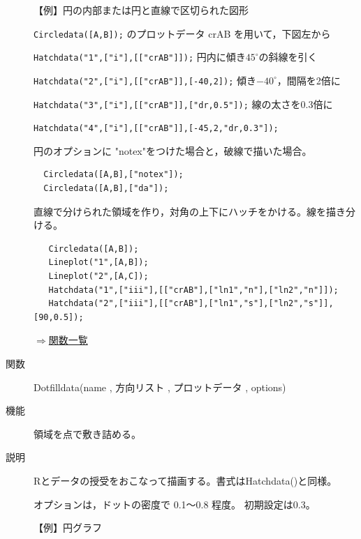 \documentclass[papersize,a4paper,12pt,uplatex]{jsarticle}
\begin{document}
\begin{description}
\vspace{\baselineskip}
【例】円の内部または円と直線で区切られた図形

\verb|Circledata([A,B]);|  のプロットデータ crAB を用いて，下図左から

\verb|Hatchdata("1",["i"],[["crAB"]]);| 円内に傾き$45^{\circ}$の斜線を引く

\verb|Hatchdata("2",["i"],[["crAB"]],[-40,2]);| 傾き$-40^{\circ}$，間隔を2倍に

\verb|Hatchdata("3",["i"],[["crAB"]],["dr,0.5"]);|  線の太さを0.3倍に

\verb|Hatchdata("4",["i"],[["crAB"]],[-45,2,"dr,0.3"]);| 

  
 
円のオプションに "notex"をつけた場合と，破線で描いた場合。
\begin{verbatim}
  Circledata([A,B],["notex"]);
  Circledata([A,B],["da"]);
 \end{verbatim}

\hspace{10mm}    

直線で分けられた領域を作り，対角の上下にハッチをかける。線を描き分ける。
\begin{verbatim}
   Circledata([A,B]);
   Lineplot("1",[A,B]);
   Lineplot("2",[A,C]);
   Hatchdata("1",["iii"],[["crAB"],["ln1","n"],["ln2","n"]]);
   Hatchdata("2",["iii"],[["crAB"],["ln1","s"],["ln2","s"]],[90,0.5]);
\end{verbatim}

\hspace{40mm}   

\begin{flushright}  \hyperlink{functionlist}{$\Rightarrow$関数一覧}\end{flushright}

\vspace{\baselineskip}
\hypertarget{dotfilldata}{}
\item[関数]  Dotfilldata(name , 方向リスト , プロットデータ , options)
\item[機能]  領域を点で敷き詰める。
\item[説明]  Rとデータの授受をおこなって描画する。書式はHatchdata()と同様。

オプションは，ドットの密度で 0.1〜0.8 程度。 初期設定は0.3。

\vspace{\baselineskip}
【例】円グラフ


\end{description}
\end{document}
